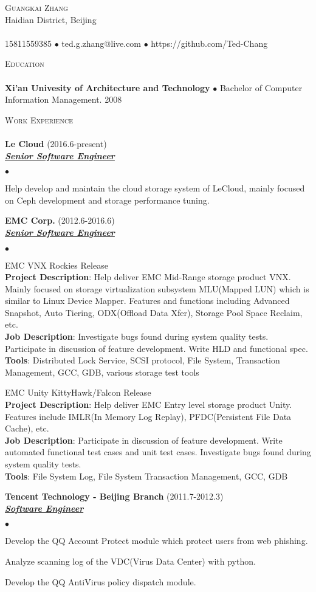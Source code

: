 \documentclass{article}
\newcommand{\lineunder}{\vspace*{-8pt} \\ \hspace*{-18pt} \hrulefill \\}
\newcommand{\header}[1]{{\hspace*{-15pt}\vspace*{6pt} \textsc{#1}} \vspace*{-6pt} \lineunder}
\newcommand{\employer}[3]{{ \textbf{#1} (#2)\\ \underline{\textbf{\emph{#3}}}\\}}
\newcommand{\contact}[3]{\vspace*{-8pt} \begin{center}{\LARGE \scshape {#1}}\\ #2 \lineunder
    #3 \end{center} \vspace*{-8pt}
}
\newcommand{\project}[4]{{#1}\\ \textbf{Project Description}:
  {#2}\\ \textbf{Job Description}: {#3}\\ \textbf{Tools}: {#4}\vspace*{3pt}}
\newenvironment{achievements}{\begin{list}{$\bullet$}{\topsep 0pt \itemsep -2pt}}{\vspace*{6pt}\end{list}}
\newcommand{\school}[2]{\textbf{#1} $\bullet$ #2 \vspace*{5pt}}
\begin{document}
\small
\smallskip
\vspace*{-44pt}

\contact{Guangkai Zhang}
{Haidian District, Beijing}
{15811559385 $\bullet$ ted.g.zhang@live.com $\bullet$ https://github.com/Ted-Chang}


\header{Education}
\school{Xi'an Univesity of Architecture and
  Technology}{Bachelor of Computer Information Management. 2008}


\header{Work Experience}
\employer{Le Cloud}{2016.6-present}{Senior Software Engineer}
\begin{achievements}
\item Help develop and maintain the cloud storage system of LeCloud, mainly focused on Ceph development and storage performance tuning.
\end{achievements}

\employer{EMC Corp.}{2012.6-2016.6}{Senior Software Engineer}
\begin{achievements}
\item
  \project{EMC VNX Rockies Release}
          {Help deliver EMC Mid-Range storage product VNX. Mainly focused on storage virtualization subsystem MLU(Mapped LUN) which is similar to Linux Device Mapper. Features and functions including Advanced Snapshot, Auto Tiering, ODX(Offload Data Xfer), Storage Pool Space Reclaim, etc.}
          {Investigate bugs found during system quality tests. Participate in discussion of feature development. Write HLD and functional spec.}
          {Distributed Lock Service, SCSI protocol, File System, Transaction Management, GCC, GDB, various storage test tools}

\item
  \project{EMC Unity KittyHawk/Falcon Release}
          {Help deliver EMC Entry level storage product Unity. Features include IMLR(In Memory Log Replay), PFDC(Persistent File Data Cache), etc.}
          {Participate in discussion of feature development. Write automated functional test cases and unit test cases. Investigate bugs found during system quality tests.}
          {File System Log, File System Transaction Management, GCC, GDB}
\end{achievements}

\employer{Tencent Technology - Beijing Branch}{2011.7-2012.3} {Software Engineer}
\begin{achievements}
\item Develop the QQ Account Protect module which protect users from web phishing.
\item Analyze scanning log of the VDC(Virus Data Center) with python.
\item Develop the QQ AntiVirus policy dispatch module.
\end{achievements}
\end{document}
